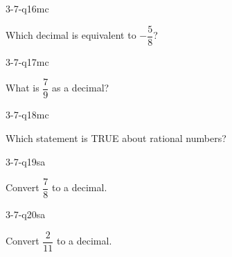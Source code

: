 \begin{practiceQuestion}{3-7-q16}{mc}
\begin{questionText}
Which decimal is equivalent to $-\dfrac{5}{8}$?
\end{questionText}
\end{practiceQuestion}

\begin{practiceQuestion}{3-7-q17}{mc}
\begin{questionText}
What is $\dfrac{7}{9}$ as a decimal?
\end{questionText}
\end{practiceQuestion}

\begin{practiceQuestion}{3-7-q18}{mc}
\begin{questionText}
Which statement is TRUE about rational numbers?
\end{questionText}
\end{practiceQuestion}


\begin{practiceQuestion}{3-7-q19}{sa}
\begin{questionText}
Convert $\dfrac{7}{8}$ to a decimal.
\end{questionText}
\end{practiceQuestion}

\begin{practiceQuestion}{3-7-q20}{sa}
\begin{questionText}
Convert $\dfrac{2}{11}$ to a decimal.
\end{questionText}
\end{practiceQuestion}

